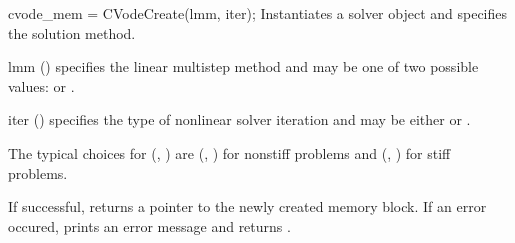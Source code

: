 {
  cvode\_mem = CVodeCreate(lmm, iter);
}
{
  Instantiates a {\cvodes} solver object and specifies the solution method.
}
{
  \begin{args}[iter]
  \item[lmm] ()
    specifies the linear multistep method and may be one of two
    possible values:  or .     
  \item[iter] ()
    specifies the type of nonlinear solver iteration and may be
    either  or . 
  \end{args}
  The typical choices for (, ) are
  (, ) for nonstiff problems and
  (, ) for stiff problems.
}
{
  If successful,  returns a pointer to the newly created 
  {\cvodes} memory block.
  If an error occured,  prints an error message 
  and returns .
}
{}



